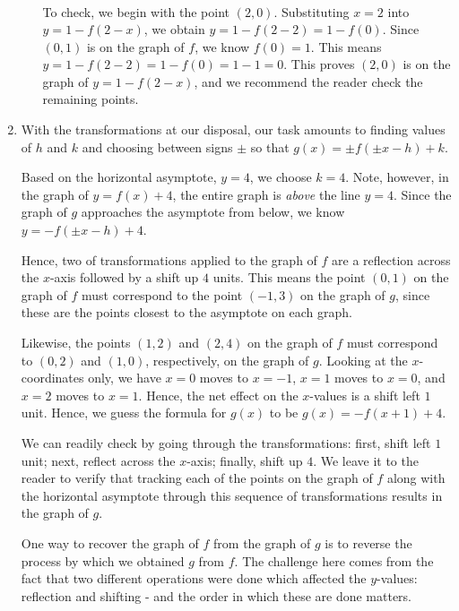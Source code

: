 \begin{ex}
\begin{enumerate}
\begin{enumerate}
\[\begin{array}{ccc}
\end{array}\]

To check, we begin with the point $(2,0)$.  Substituting $x=2$ into $y=1 - f(2-x)$, we obtain $y = 1-f(2-2) = 1-f(0)$.  Since $(0,1)$ is on the graph of $f$, we know $f(0) = 1$.  This means $y = 1-f(2-2) = 1-f(0)= 1-1 = 0$.  This proves $(2,0)$ is on the graph of  $y=1 - f(2-x)$, and we recommend the reader check the remaining points.
 
 \end{enumerate}

 \item With the transformations at our disposal,  our task amounts to finding values of $h$ and $k$ and choosing between signs $\pm$  so that  $g(x) = \pm f( \pm x - h) + k$.  
 
 \smallskip
 
 Based on the horizontal asymptote, $y=4$, we choose $k=4$.  Note, however, in the graph of $y=f(x)+4$, the entire graph is \textit{above} the line $y=4$.  Since the graph of $g$ approaches the asymptote from below, we know  $y=-f(\pm x-h)+4$.  
 
 \smallskip
 
 Hence, two of transformations applied to the graph of $f$ are a reflection across the $x$-axis followed by a shift up $4$ units.  This means the point $(0,1)$ on the graph of $f$ must correspond to the point $(-1,3)$ on the graph of $g$, since these are the points closest to the asymptote on each graph.  
  
  \smallskip
  
Likewise, the points $(1,2)$ and $(2,4)$ on the graph of $f$ must correspond to $(0,2)$ and $(1,0)$, respectively, on the graph of $g$.  Looking at the $x$-coordinates only, we have $x=0$ moves to $x=-1$, $x=1$ moves to $x=0$, and $x=2$ moves to $x=1$.  Hence, the net effect on the $x$-values is a shift left $1$ unit.  Hence, we guess the formula for $g(x)$ to be $g(x) = -f(x+1)+4$.  

\smallskip

We can readily check by going through the transformations:  first, shift left $1$ unit; next,  reflect across the $x$-axis;  finally, shift up $4$.  We leave it to the reader to verify that tracking each of the points on the graph of $f$ along with the horizontal asymptote through this sequence of transformations results in the graph of $g$.  
 
 
 \smallskip
 
 
 One way to recover the graph of $f$ from the graph of $g$ is to reverse the process by which we obtained $g$ from $f$.  The challenge here comes from the fact that two different operations were done which affected the $y$-values:  reflection and shifting - and the order in which these are done matters.  
 

\end{enumerate}
\end{ex}
